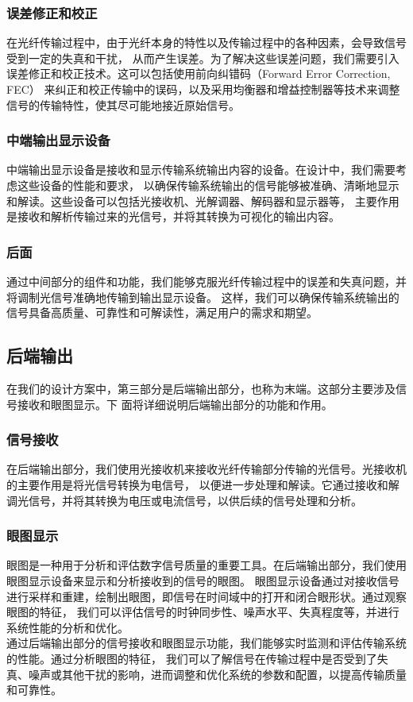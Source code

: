 \documentclass[12pt]{article}
\begin{document}
\subsubsection*{误差修正和校正}
在光纤传输过程中，由于光纤本身的特性以及传输过程中的各种因素，会导致信号受到一定的失真和干扰，
从而产生误差。为了解决这些误差问题，我们需要引入误差修正和校正技术。这可以包括使用前向纠错码（Forward Error Correction, FEC）
来纠正和校正传输中的误码，以及采用均衡器和增益控制器等技术来调整信号的传输特性，使其尽可能地接近原始信号。
\subsubsection*{中端输出显示设备}
中端输出显示设备是接收和显示传输系统输出内容的设备。在设计中，我们需要考虑这些设备的性能和要求，
以确保传输系统输出的信号能够被准确、清晰地显示和解读。这些设备可以包括光接收机、光解调器、解码器和显示器等，
主要作用是接收和解析传输过来的光信号，并将其转换为可视化的输出内容。
\subsubsection*{后面}
通过中间部分的组件和功能，我们能够克服光纤传输过程中的误差和失真问题，并将调制光信号准确地传输到输出显示设备。
这样，我们可以确保传输系统输出的信号具备高质量、可靠性和可解读性，满足用户的需求和期望。
\subsection{后端输出}
在我们的设计方案中，第三部分是后端输出部分，也称为末端。这部分主要涉及信号接收和眼图显示。下
面将详细说明后端输出部分的功能和作用。
\subsubsection*{信号接收}
在后端输出部分，我们使用光接收机来接收光纤传输部分传输的光信号。光接收机的主要作用是将光信号转换为电信号，
以便进一步处理和解读。它通过接收和解调光信号，并将其转换为电压或电流信号，以供后续的信号处理和分析。
\subsubsection*{眼图显示}
眼图是一种用于分析和评估数字信号质量的重要工具。在后端输出部分，我们使用眼图显示设备来显示和分析接收到的信号的眼图。
眼图显示设备通过对接收信号进行采样和重建，绘制出眼图，即信号在时间域中的打开和闭合眼形状。通过观察眼图的特征，
我们可以评估信号的时钟同步性、噪声水平、失真程度等，并进行系统性能的分析和优化。
\\
通过后端输出部分的信号接收和眼图显示功能，我们能够实时监测和评估传输系统的性能。通过分析眼图的特征，
我们可以了解信号在传输过程中是否受到了失真、噪声或其他干扰的影响，进而调整和优化系统的参数和配置，以提高传输质量和可靠性。
\\
\end{document}
